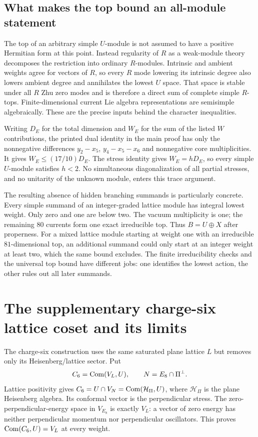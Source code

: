 \subsection{What makes the top bound an all-module statement}

The top of an arbitrary simple $U$-module is not assumed to have a
positive Hermitian form at this point. Instead regularity of $R$
as a weak-module theory decomposes the restriction into ordinary
$R$-modules. Intrinsic and ambient weights agree for vectors of
$R$, so every $R$ mode lowering its intrinsic degree also lowers
ambient degree and annihilates the lowest $U$ space. That space is
stable under all $R$ Zhu zero modes and is therefore a direct sum
of complete simple $R$-tops. Finite-dimensional current Lie algebra
representations are semisimple algebraically. These are the precise
inputs behind the character inequalities.

Writing $D_E$ for the total dimension and $W_E$ for the sum of
the listed $W$ contributions, the printed dual identity in the
main proof has only the nonnegative differences
$y_2-x_5$, $y_4-x_5-x_6$ and nonnegative core multiplicities.
It gives $W_E\le(17/10)D_E$. The stress identity gives
$W_E=hD_E$, so every simple $U$-module satisfies $h<2$.
No simultaneous diagonalization of all partial stresses, and no
unitarity of the unknown module, enters this trace argument.

The resulting absence of hidden branching summands is particularly
concrete. Every simple summand of an integer-graded lattice module
has integral lowest weight. Only zero and one are below two.
The vacuum multiplicity is one; the remaining $80$ currents form
one exact irreducible top. Thus $B=U\oplus X$ after properness.
For a mixed lattice module starting at weight one with an
irreducible $81$-dimensional top, an additional summand could only
start at an integer weight at least two, which the same bound
excludes. The finite irreducibility checks and the universal top
bound have different jobs: one identifies the lowest action,
the other rules out all later summands.

\section{The supplementary charge-six lattice coset and its limits}
\label{expstructure:c6}

The charge-six construction uses the same saturated plane lattice
$L$ but removes only its Heisenberg/lattice sector. Put
\[
 C_6=\operatorname{Com}(V_L,U),\qquad N=E_8\cap\Pi^\perp.
\]
Lattice positivity gives
$C_6=U\cap V_N=\operatorname{Com}(\mathcal H_\Pi,U)$, where
$\mathcal H_\Pi$ is the plane Heisenberg algebra. Its conformal
vector is the perpendicular stress. The zero-perpendicular-energy
space in $V_{E_8}$ is exactly $V_L$: a vector of zero energy has
neither perpendicular momentum nor perpendicular oscillators.
This proves $\operatorname{Com}(C_6,U)=V_L$ at every weight.

